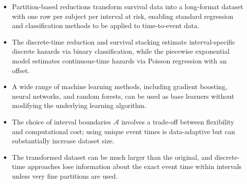 \documentclass[
  letterpaper,
  krantz2]{style/krantz}
\providecommand{\tightlist}{%
  \setlength{\itemsep}{0pt}\setlength{\parskip}{0pt}}
\begin{document}
\begin{tcolorbox}[enhanced jigsaw, toprule=.15mm, bottomtitle=1mm, opacityback=0, breakable, leftrule=.75mm, title={Key takeaways}, toptitle=1mm, bottomrule=.15mm, colback=white, colframe=quarto-callout-warning-color-frame, titlerule=0mm, opacitybacktitle=0.6, coltitle=black, rightrule=.15mm, left=2mm, colbacktitle=quarto-callout-warning-color!10!white, arc=.35mm]

\begin{itemize}
\tightlist
\item
  Partition-based reductions transform survival data into a long-format
  dataset with one row per subject per interval at risk, enabling
  standard regression and classification methods to be applied to
  time-to-event data.
\item
  The discrete-time reduction and survival stacking estimate
  interval-specific discrete hazards via binary classification, while
  the piecewise exponential model estimates continuous-time hazards via
  Poisson regression with an offset.
\item
  A wide range of machine learning methods, including gradient boosting,
  neural networks, and random forests, can be used as base learners
  without modifying the underlying learning algorithm.
\item
  The choice of interval boundaries \(\mathcal{A}\) involves a trade-off
  between flexibility and computational cost; using unique event times
  is data-adaptive but can substantially increase dataset size.
\item
  The transformed dataset can be much larger than the original, and
  discrete-time approaches lose information about the exact event time
  within intervals unless very fine partitions are used.
\end{itemize}

\end{tcolorbox}
\end{document}
